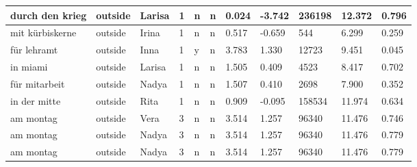 \begin{longtable}{|p{4cm}|p{1cm}|p{1.2cm}|p{0.5cm}|p{0.5cm}|p{0.5cm}|R{1cm}|R{1cm}|R{1cm}|R{1cm}|R{1cm}|}
durch den krieg            & outside           & Larisa        & 1                                   & n                          & n                          & 0.024      & -3.742        & 236198                  & 12.372                        & 0.796                   \\ \hline
mit k\"{u}rbiskerne        & outside           & Irina         & 1                                   & n                          & n                          & 0.517      & -0.659        & 544                     & 6.299                         & 0.259                   \\ \hline
f\"{u}r lehramt            & outside           & Inna          & 1                                   & y                          & n                          & 3.783      & 1.330         & 12723                   & 9.451                         & 0.045                   \\ \hline
in miami                   & outside           & Larisa        & 1                                   & n                          & n                          & 1.505      & 0.409         & 4523                    & 8.417                         & 0.702                   \\ \hline
f\"{u}r mitarbeit          & outside           & Nadya         & 1                                   & n                          & n                          & 1.507      & 0.410         & 2698                    & 7.900                         & 0.352                   \\ \hline
in der mitte               & outside           & Rita          & 1                                   & n                          & n                          & 0.909      & -0.095        & 158534                  & 11.974                        & 0.634                   \\ \hline
am montag                  & outside           & Vera          & 3                                   & n                          & n                          & 3.514      & 1.257         & 96340                   & 11.476                        & 0.746                   \\ \hline
am montag                  & outside           & Nadya         & 3                                   & n                          & n                          & 3.514      & 1.257         & 96340                   & 11.476                        & 0.779                   \\ \hline
am montag                  & outside           & Nadya         & 3                                   & n                          & n                          & 3.514      & 1.257         & 96340                   & 11.476                        & 0.779                   \\ \hline

\end{longtable}
